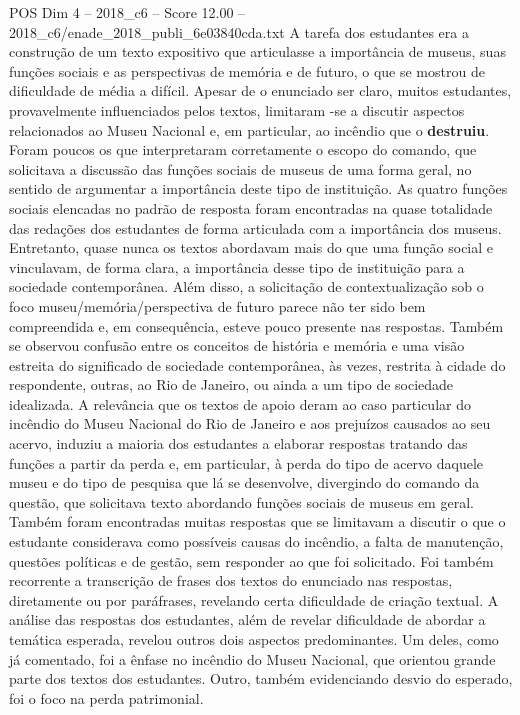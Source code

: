 \begin{textsample}{POS Dim 4 – 2018\_c6 – Score 12.00 – 2018\_c6/enade\_2018\_publi\_6e03840cda.txt}
A tarefa dos estudantes era a construção de um texto expositivo que articulasse a importância de museus, suas funções sociais e as perspectivas de memória e de futuro, o que se mostrou de dificuldade de média a difícil.
Apesar de o enunciado ser claro, muitos estudantes, provavelmente influenciados pelos textos, limitaram -se a discutir aspectos relacionados ao Museu Nacional e, em particular, ao incêndio que o \textbf{destruiu}.
Foram poucos os que interpretaram corretamente o escopo do comando, que solicitava a discussão das funções sociais de museus de uma forma geral, no sentido de argumentar a importância deste tipo de instituição.
As quatro funções sociais elencadas no padrão de resposta foram encontradas na quase totalidade das redações dos estudantes de forma articulada com a importância dos museus.
Entretanto, quase nunca os textos abordavam mais do que uma função social e vinculavam, de forma clara, a importância desse tipo de instituição para a sociedade contemporânea.
Além disso, a solicitação de contextualização sob o foco museu/memória/perspectiva de futuro parece não ter sido bem compreendida e, em consequência, esteve pouco presente nas respostas.
Também se observou confusão entre os conceitos de história e memória e uma visão estreita do significado de sociedade contemporânea, às vezes, restrita à cidade do respondente, outras, ao Rio de Janeiro, ou ainda a um tipo de sociedade idealizada.
A relevância que os textos de apoio deram ao caso particular do incêndio do Museu Nacional do Rio de Janeiro e aos prejuízos causados ao seu acervo, induziu a maioria dos estudantes a elaborar respostas tratando das funções a partir da perda e, em particular, à perda do tipo de acervo daquele museu e do tipo de pesquisa que lá se desenvolve, divergindo do comando da questão, que solicitava texto abordando funções sociais de museus em geral.
Também foram encontradas muitas respostas que se limitavam a discutir o que o estudante considerava como possíveis causas do incêndio, a falta de manutenção, questões políticas e de gestão, sem responder ao que foi solicitado.
Foi também recorrente a transcrição de frases dos textos do enunciado nas respostas, diretamente ou por paráfrases, revelando certa dificuldade de criação textual.
A análise das respostas dos estudantes, além de revelar dificuldade de abordar a temática esperada, revelou outros dois aspectos predominantes.
Um deles, como já comentado, foi a ênfase no incêndio do Museu Nacional, que orientou grande parte dos textos dos estudantes.
Outro, também evidenciando desvio do esperado, foi o foco na perda patrimonial.

\end{textsample}
